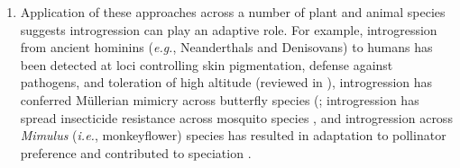 \documentclass[11pt]{article}
\newcommand{\lwang}[1]{\textcolor{red}{ \emph{\scriptsize  #1}} } %
\begin{document}
\begin{enumerate}
\item{Application of these approaches across a number of plant and animal species suggests introgression can play an adaptive role. For example, introgression from ancient hominins (\emph{e.g.}, Neanderthals and Denisovans) to humans has been detected at loci controlling skin pigmentation, defense against pathogens, and toleration of high altitude (reviewed in \cite{Racimo2015}), introgression has conferred M\"{u}llerian mimicry across butterfly species (\cite{Heliconius2012}; introgression has spread insecticide resistance across mosquito species \cite{Norris2015}, and introgression across \emph{Mimulus} (\emph{i.e.}, monkeyflower) species has resulted in adaptation to pollinator preference and contributed to speciation \cite{Stankowski2015}}.
\end{enumerate}






\end{document}
